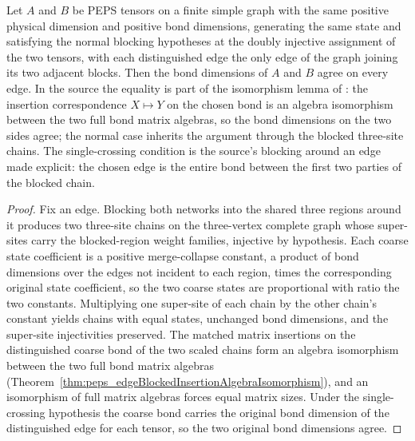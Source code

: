 \begin{theorem}%
    \label{thm:peps_bondDim_eq_of_normalBlocking}
    \leanok
    Let $A$ and $B$ be PEPS tensors on a finite simple graph with the same
    positive physical dimension and positive bond dimensions, generating the
    same state and satisfying the normal blocking hypotheses at the doubly
    injective assignment of the two tensors, with each distinguished edge the
    only edge of the graph joining its two adjacent blocks.  Then the bond
    dimensions of $A$ and $B$ agree on every edge.
    In the source the equality is part of the isomorphism lemma of
    \cite[Section~3]{Molnar2018NormalPEPS}: the insertion correspondence
    $X\mapsto Y$ on the chosen bond is an algebra isomorphism between the two
    full bond matrix algebras, so the bond dimensions on the two sides agree;
    the normal case inherits the argument through the blocked three-site
    chains.  The single-crossing condition is the source's blocking around an
    edge made explicit: the chosen edge is the entire bond between the first
    two parties of the blocked chain.
    \begin{proof}
        \leanok
        Fix an edge.  Blocking both networks into the shared three regions
        around it produces two three-site chains on the three-vertex complete
        graph whose super-sites carry the blocked-region weight families,
        injective by hypothesis.  Each coarse state coefficient is a positive
        merge-collapse constant, a product of bond dimensions over the edges
        not incident to each region, times the corresponding original state
        coefficient, so the two coarse states are proportional with ratio the
        two constants.  Multiplying one super-site of each chain by the other
        chain's constant yields chains with equal states, unchanged bond
        dimensions, and the super-site injectivities preserved.  The matched
        matrix insertions on the distinguished coarse bond of the two scaled
        chains form an algebra isomorphism between the two full bond matrix
        algebras
        (Theorem~\ref{thm:peps_edgeBlockedInsertionAlgebraIsomorphism}), and
        an isomorphism of full matrix algebras forces equal matrix sizes.
        Under the single-crossing hypothesis the coarse bond carries the
        original bond dimension of the distinguished edge for each tensor, so
        the two original bond dimensions agree.
    \end{proof}
\end{theorem}

